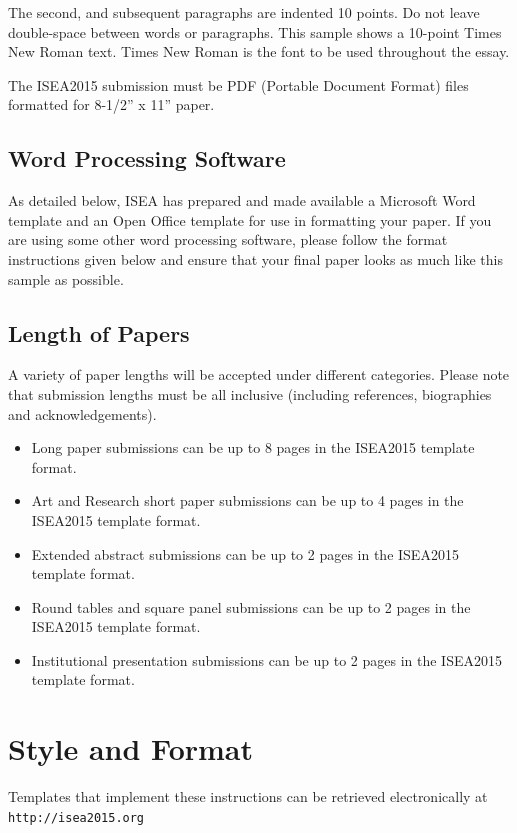 \documentclass[letterpaper]{article}
\begin{document}
The second, and subsequent paragraphs are indented 10 points. Do  not  leave  double-space  between   words  or  paragraphs. This sample shows a 10-point Times New Roman text. Times New  Roman  is  the font to be used throughout the essay.

The ISEA2015 submission must be PDF (Portable Document Format) files formatted for 8-1/2'' x 11'' paper.

\subsection{Word Processing Software}

As detailed below, ISEA has prepared and made available a Microsoft Word template and an Open Office template for use in formatting your paper. If you are using some other word processing software, please follow the format instructions given below and ensure that your final paper looks as much like this sample as possible.

\subsection{Length of Papers}

A variety of paper lengths will be accepted under different categories. Please note that submission lengths must be all inclusive (including references, biographies and acknowledgements).
\begin{itemize}
\item Long paper submissions can be up to 8 pages in the ISEA2015 template format.
\item Art and Research short paper submissions can be up to 4 pages in the ISEA2015 template format.
\item Extended abstract submissions can be up to 2 pages in the ISEA2015 template format.
\item Round tables and square panel submissions can be up to 2 pages in the ISEA2015 template format.
\item Institutional presentation submissions can be up to 2 pages in the ISEA2015 template format.
\end{itemize}

\section{Style and Format}
Templates that implement these instructions can be retrieved electronically at {\small \tt http://isea2015.org}
\end{document}
